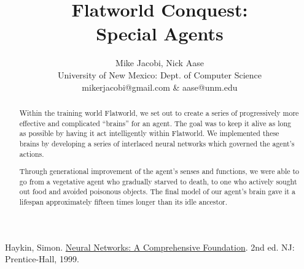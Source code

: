\documentclass[12pt]{article}
\title{{\bf Flatworld Conquest:\\
    Special Agents}}
\author{Mike Jacobi, Nick Aase\\
University of New Mexico: Dept. of Computer Science\\
\normalsize  mikerjacobi@gmail.com \& aase@unm.edu}
\date{}
\begin{document}
\begin{sloppypar}

\maketitle



\renewcommand{\abstractname}{\Large Abstract}
\begin{abstract}
  \begin{singlespace}
    Within the training world Flatworld, we set out to create a series of 
    progressively more effective and complicated ``brains'' for an agent.
    The goal was to keep it alive as long as possible by having it act 
    intelligently within Flatworld. We implemented these brains by developing 
    a series of interlaced neural networks which governed the agent's actions.

    Through generational improvement of the agent's senses and functions,
    we were able to go from a vegetative agent who gradually starved to death,
    to one who actively sought out food and avoided poisonous objects. The
    final model of our agent's brain gave it a lifespan approximately 
    fifteen times longer than its idle ancestor.
  \end{singlespace}
\end{abstract}










\end{sloppypar}

\begin{thebibliography}{9}

  Haykin, Simon. \underline{Neural Networks: A Comprehensive Foundation}. 2nd ed. NJ: Prentice-Hall, 1999.

\end{thebibliography}
\end{document}
